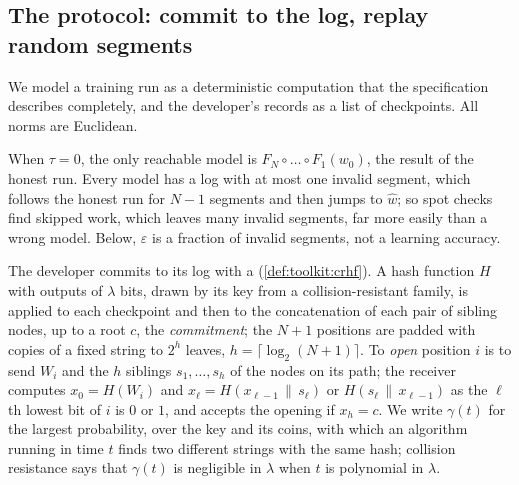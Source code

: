 \begin{refsection}
\section{The protocol: commit to the log, replay random segments}\label{sec:training:protocol}

We model a training run as a deterministic computation that the specification describes completely, and the developer's records as a list of checkpoints. All norms are Euclidean.


When $\tau=0$, the only reachable model is $F_N\circ\dots\circ F_1(w_0)$, the result of the honest run. Every model has a log with at most one invalid segment, which follows the honest run for $N-1$ segments and then jumps to $\hat w$; so spot checks find skipped work, which leaves many invalid segments, far more easily than a wrong model. Below, $\varepsilon$ is a fraction of invalid segments, not a learning accuracy.

The developer commits to its log with a  (\cref{def:toolkit:crhf}). A hash function $H$ with outputs of $\lambda$ bits, drawn by its key from a collision-resistant family, is applied to each checkpoint and then to the concatenation of each pair of sibling nodes, up to a root $c$, the \emph{commitment}; the $N+1$ positions are padded with copies of a fixed string to $2^h$ leaves, $h=\lceil\log_2(N+1)\rceil$. To \emph{open} position $i$ is to send $W_i$ and the $h$ siblings $s_1,\dots,s_h$ of the nodes on its path; the receiver computes $x_0=H(W_i)$ and $x_\ell=H(x_{\ell-1}\,\|\,s_\ell)$ or $H(s_\ell\,\|\,x_{\ell-1})$ as the $\ell$th lowest bit of $i$ is $0$ or $1$, and accepts the opening if $x_h=c$. We write $\gamma(t)$ for the largest probability, over the key and its coins, with which an algorithm running in time $t$ finds two different strings with the same hash; collision resistance says that $\gamma(t)$ is negligible in $\lambda$ when $t$ is polynomial in $\lambda$.


\end{refsection}
